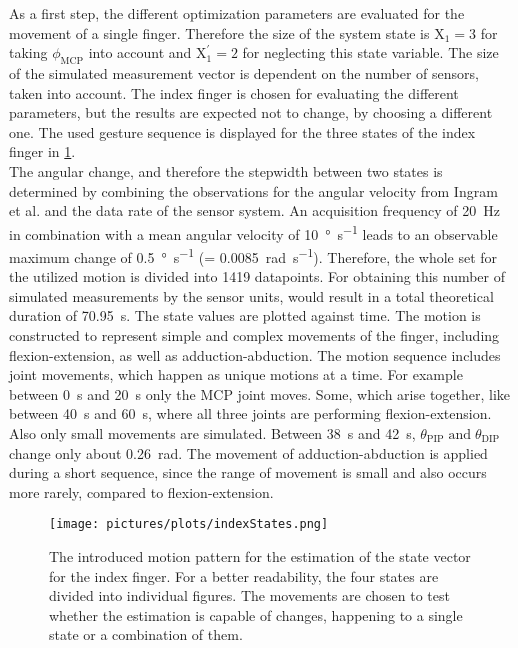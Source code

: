 As a first step, the different optimization parameters are evaluated for the movement of a single finger. Therefore the size of the system state  is $ \mathrm{X}_{1} = 3 $ for taking $ \phi_{\mathrm{MCP}} $ into account and $ \mathrm{X}^\prime_{1} = 2 $ for neglecting this state variable. The size of the simulated measurement vector is dependent on the number of sensors, taken into account. The index finger is chosen for evaluating the different parameters, but the results are expected not to change, by choosing a different one. The used gesture sequence is displayed for the three states of the index finger in \ref{fig:indexStates}.\\
The angular change, and therefore the stepwidth between two states is determined by combining the observations for the angular velocity from Ingram et al. \cite{ingram2008statistics} and the data rate of the sensor system. An acquisition frequency of \SI{20}{\Hz} in combination with a mean angular velocity of \SI[per-mode=symbol]{10}{\degree \per \second} leads to an observable maximum change of \SI[per-mode=symbol]{0.5}{\degree \per \second} (= \SI[per-mode=symbol]{0.0085}{\radian \per \second}). Therefore, the whole set for the utilized motion is divided into 1419 datapoints. For obtaining this number of simulated measurements by the sensor units, would result in a total theoretical duration of \SI{70.95}{\second}. The state values are plotted against time. The motion is constructed to represent simple and complex movements of the finger, including flexion-extension, as well as adduction-abduction. The motion sequence includes joint movements, which happen as unique motions at a time. For example between \SI{0}{\second} and \SI{20}{\second} only the \ac{MCP} joint moves. Some, which arise together, like between \SI{40}{\second} and \SI{60}{\second}, where all three joints are performing flexion-extension. Also only small movements are simulated. Between \SI{38}{\second} and \SI{42}{\second}, $ \theta_{\mathrm{PIP}} \; \text{and} \; \theta_{\mathrm{DIP}} $ change only about \SI{0.26}{\radian}. The movement of adduction-abduction is applied during a short sequence, since the range of movement is small and also occurs more rarely, compared to flexion-extension.\\
\begin{figure}[!htb]
\centering
\texttt{[image: pictures/plots/indexStates.png]}
\caption[Introduced movement pattern for index finger estimation]
{The introduced motion pattern for the estimation of the state vector for the index finger. For a better readability, the four states are divided into individual figures. The movements are chosen to test whether the estimation is capable of changes, happening to a single state or a combination of them.}
\label{fig:indexStates}
\end{figure}
